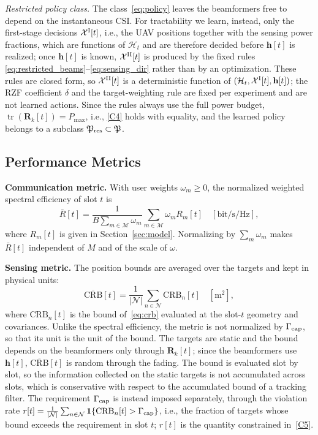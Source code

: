 \documentclass[conference]{IEEEtran}
\begin{document}
\emph{Restricted policy class.} The class~\eqref{eq:policy} leaves the beamformers free to depend on the instantaneous CSI. For tractability we learn, instead, only the first-stage decisions $\mathcal X^{\rm I}[t]$, i.e., the UAV positions together with the sensing power fractions, which are functions of $\mathcal H_t$ and are therefore decided before $\mathbf h[t]$ is realized; once $\mathbf h[t]$ is known, $\mathcal X^{\rm II}[t]$ is produced by the fixed rules \eqref{eq:restricted_beams}--\eqref{eq:sensing_dir} rather than by an optimization. These rules are closed form, so $\mathcal X^{\rm II}[t]$ is a deterministic function of $(\mathcal H_t,\mathcal X^{\rm I}[t],\mathbf h[t])$; the RZF coefficient $\delta$ and the target-weighting rule are fixed per experiment and are not learned actions. Since the rules always use the full power budget, $\operatorname{tr}(\mathbf R_k[t])=P_{\max}$, i.e., \eqref{C4} holds with equality, and the learned policy belongs to a subclass $\mathfrak P_{\rm res}\subset\mathfrak P$.


\subsection{Performance Metrics}

\textbf{Communication metric.} With user weights $\omega_m\ge 0$, the normalized weighted spectral efficiency of slot $t$ is
\begin{equation}
\bar R[t]=\frac{1}{B\sum_{m\in\mathcal M}\omega_m}\sum_{m\in\mathcal M}\omega_m R_m[t]\quad[\mathrm{bit/s/Hz}],
\end{equation}
where $R_m[t]$ is given in Section~\ref{sec:model}. Normalizing by $\sum_m\omega_m$ makes $\bar R[t]$ independent of $M$ and of the scale of $\omega$.

\textbf{Sensing metric.} The position bounds are averaged over the targets and kept in physical units:
\begin{equation}\label{eq:metric_c}
\overline{\mathrm{CRB}}[t]=\frac{1}{|\mathcal N|}\sum_{n\in\mathcal N}\mathrm{CRB}_n[t]\quad[\mathrm{m}^2],
\end{equation}
where $\mathrm{CRB}_n[t]$ is the bound of~\eqref{eq:crb} evaluated at the slot-$t$ geometry and covariances. Unlike the spectral efficiency, the metric is not normalized by $\Gamma_{\rm cap}$, so that its unit is the unit of the bound. The targets are static and the bound depends on the beamformers only through $\mathbf R_k[t]$; since the beamformers use $\mathbf h[t]$, $\overline{\mathrm{CRB}}[t]$ is random through the fading. The bound is evaluated slot by slot, so the information collected on the static targets is not accumulated across slots, which is conservative with respect to the accumulated bound of a tracking filter. The requirement $\Gamma_{\rm cap}$ is instead imposed separately, through the violation rate $r[t]=\frac{1}{|\mathcal N|}\sum_{n\in\mathcal N}\mathbf 1\{\mathrm{CRB}_n[t]>\Gamma_{\rm cap}\}$, i.e., the fraction of targets whose bound exceeds the requirement in slot $t$; $r[t]$ is the quantity constrained in~\eqref{C5}.
\end{document}
